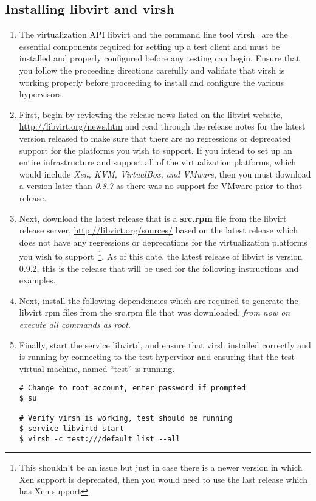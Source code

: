 \subsection{Installing libvirt and virsh}
\label{sec:debianvirsh}
\begin{enumerate}
\item	The virtualization API libvirt and the command line tool virsh~\cite{libvirt} are the essential components required 
		for setting up a test client and must be installed and properly configured before any testing can begin. Ensure that
		you follow the proceeding directions carefully and validate that virsh is working properly before proceeding to 
		install and configure the various hypervisors.
		
\item	First, begin by reviewing the release news listed on the libvirt website, \url{http://libvirt.org/news.htm} and read 
		through the release notes for the latest version released to make sure that there are no regressions or deprecated 
		support for the platforms you wish to support. If you intend to set up an entire infrastructure and support all of the
		\cernvm virtualization platforms, which would include \emph{Xen, KVM, VirtualBox, and VMware}, then you must download
		a version later than \emph{0.8.7} as there was no support for VMware prior to that release.

\item	Next, download the latest release that is a {\bf src.rpm} file from the libvirt release server, 
		\url{http://libvirt.org/sources/} based on the latest release which does not have any regressions or deprecations for
		the virtualization platforms you wish to support~\footnote{This shouldn't be an issue but just in case there is a 
		newer version in which Xen support is deprecated, then you would need to use the last release which has Xen support}.
		As of this date, the latest release of libvirt is version 0.9.2, this is the release that will be used for the
		following instructions and examples.
		
\item	Next, install the following dependencies which are required to generate the libvirt rpm files from the src.rpm file
		that was downloaded, \emph{from now on execute all commands as root}.
		


\item 	Finally, start the service libvirtd, and ensure that virsh installed correctly and is running by 
		connecting to the test hypervisor and ensuring that the test virtual machine, named ``test'' is running.

\lstset{language=bash,caption=Verify virsh was Installed Properly}
\begin{lstlisting}
# Change to root account, enter password if prompted
$ su

# Verify virsh is working, test should be running
$ service libvirtd start
$ virsh -c test:///default list --all
\end{lstlisting}
\end{enumerate}





